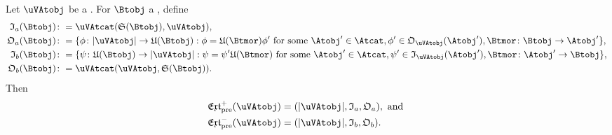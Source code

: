 \documentclass[%
a4paper,%
arxiv,%
defaults
]{myclass}
\begin{document}
\begin{proposition}
\label{prop:extpre}
Let \(\uVAtobj\) be a \uVAtobj.
For \(\Btobj\) a \Btobjalt, define
%
\begin{align*}
  \itest_a(\Btobj) &\coloneqq \Hom{\uVAtcat}{\sfunc(\Btobj)}{\uVAtobj}, \\
%
  \otest_a(\Btobj) &\coloneqq \{\ofn \colon \forfunc[\uVAtobj] \to \ufunc(\Btobj) : \ofn = \ufunc(\Btmor)\ofn' \text{ for some } \Atobj' \in \Atcat, \ofn' \in \otest_{\uVAtobj}(\Atobj'), \Btmor \colon \Btobj \to \Atobj'\}, \\
%
  \itest_b(\Btobj) &\coloneqq \{\ifn \colon \ufunc(\Btobj) \to \forfunc[\uVAtobj] : \ifn = \ifn' \ufunc(\Btmor) \text{ for some } \Atobj' \in \Atcat, \ifn' \in \itest_{\uVAtobj}(\Atobj'), \Btmor \colon \Atobj' \to \Btobj\}, \\
%
  \otest_b(\Btobj) &\coloneqq \Hom{\uVAtcat}{\uVAtobj}{\sfunc(\Btobj)}.
\end{align*}
%
Then
%
\begin{align*}
\PJextfunc(\uVAtobj) &= (\forfunc[\uVAtobj], \itest_a, \otest_a), \text{ and } \\
%
\PMextfunc(\uVAtobj) &= (\forfunc[\uVAtobj], \itest_b, \otest_b).
\end{align*}
\end{proposition}
\end{document}
